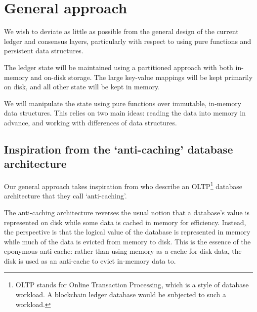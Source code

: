 \documentclass[11pt,a4paper]{article}
\begin{document}
\section{General approach}
\label{general-approach}

We wish to deviate as little as possible from the general design of the current
ledger and consensus layers, particularly with respect to using pure functions
and persistent data structures.

The ledger state will be maintained using a partitioned approach with both
in-memory and on-disk storage. The large key-value mappings will be kept primarily on
disk, and all other state will be kept in memory.

We will manipulate the state using pure functions over immutable, in-memory data
structures. This relies on two main ideas: reading the data into memory in
advance, and working with differences of data structures.

\subsection{Inspiration from the `anti-caching' database architecture}
\label{anti-caching}

Our general approach takes inspiration from \citet{anti-caching} who describe an
OLTP\footnote{OLTP stands for Online Transaction Processing, which is a style of
database workload. A blockchain ledger database would be subjected to such a
workload.} database architecture that they call `anti-caching'.

The anti-caching architecture reverses the usual notion that a database's value
is represented on disk while some data is cached in memory for efficiency.
Instead, the perspective is that the logical value of the database is
represented in memory while much of the data is evicted from memory to disk.
This is the essence of the eponymous anti-cache: rather than using memory as a
cache for disk data, the disk is used as an anti-cache to evict in-memory data
to.

\end{document}
